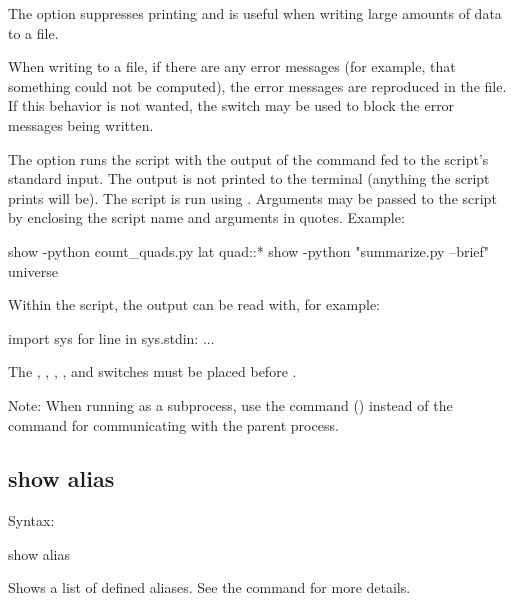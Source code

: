 {{{{{{{{{The  option suppresses printing and is useful when writing large amounts of data to a
file.

When writing to a file, if there are any error messages (for example, that something could not be
computed), the error messages are reproduced in the file. If this behavior is not wanted, the
 switch may be used to block the error messages being written.

The  option runs the  script  with the output of the 
command fed to the script's standard input. The output is not printed to the terminal (anything the
script prints will be). The script is run using . Arguments may be passed to the script
by enclosing the script name and arguments in quotes. Example:
\begin{example}
  show -python count_quads.py lat quad::*
  show -python "summarize.py --brief" universe
\end{example}
Within the script, the output can be read with, for example:
\begin{example}
  import sys
  for line in sys.stdin:
    ...
\end{example}

The , , , , and  switches must be
placed before .

Note: When running \tao as a subprocess, use the  command ()
instead of the  command for communicating with the parent process.



\subsection{show alias}
\label{s:show.alias}

Syntax:
\begin{example}
  show alias
\end{example}

Shows a list of defined aliases. See the  command for more details.


}}}}}}}}}
